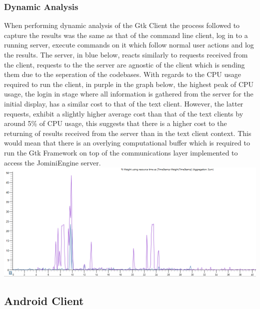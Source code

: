 \documentclass{article}
\begin{document}
\subsubsection{Dynamic Analysis}
When performing dynamic analysis of the Gtk Client the process followed to capture the results was the same as that of the command line client, log in to a running server, execute commands on it which follow normal user actions and log the results. The server, in blue below, reacts similarly to requests received from the client, requests to the the server are agnostic of the client which is sending them due to the seperation of the codebases. With regards to the CPU usage required to run the client, in purple in the graph below, the highest peak of CPU usage, the login in stage where all information is gathered from the server for the initial display, has a similar cost to that of the text client. However, the latter requests, exhibit a slightly higher average cost than that of the text clients by around 5\% of CPU usage, this suggests that there is a higher cost to the returning of results received from the server than in the text client context. This would mean that there is an overlying computational buffer which is required to run the Gtk Framework on top of the communications layer implemented to access the JominiEngine server.
\includegraphics[width=\textwidth]{gtkclientgraph.PNG}
\subsection{Android Client}
\end{document}
